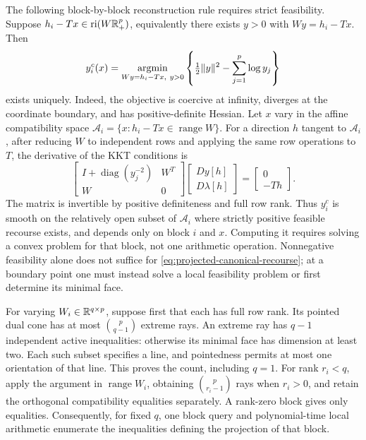 The following block-by-block reconstruction rule requires strict
feasibility.  Suppose $h_i-Tx\in\operatorname{ri}(W\mathbb R_+^p)$, equivalently there exists
$y>0$ with $Wy=h_i-Tx$.  Then
\begin{equation}\label{eq:projected-canonical-recourse}
 y_i^c(x)=\underset{Wy=h_i-Tx,\ y>0}{\operatorname{argmin}}
 \left\{\tfrac12\lVert y\rVert^2-\sum_{j=1}^p\log y_j\right\}
\end{equation}
exists uniquely.  Indeed, the objective is coercive at infinity, diverges
at the coordinate boundary, and has positive-definite Hessian.
Let $x$ vary in the affine compatibility space
$\mathcal A_i=\{x:h_i-Tx\in\operatorname{range}W\}$.
For a direction $h$ tangent to $\mathcal A_i$, after reducing $W$ to
independent rows and applying the same row operations to $T$, the
derivative of the KKT conditions is
\[
 \begin{bmatrix}I+\operatorname{diag}(y_j^{-2})&W^T\\W&0\end{bmatrix}
 \begin{bmatrix}Dy[h]\\D\lambda[h]\end{bmatrix}
 =\begin{bmatrix}0\\-Th\end{bmatrix}.
\]
The matrix is invertible by positive definiteness and full row rank.
Thus $y_i^c$ is smooth on the relatively open subset of $\mathcal A_i$
where strictly positive feasible recourse exists, and depends only on
block $i$ and $x$.  Computing it requires solving a convex problem for
that block, not one arithmetic operation.
Nonnegative feasibility alone does not suffice for
\eqref{eq:projected-canonical-recourse}; at a boundary point one must
instead solve a local feasibility problem or first determine its minimal
face.

For varying $W_i\in\mathbb R^{q\times p}$, suppose first that each has full row
rank.  Its pointed dual cone has at most $\binom p{q-1}$ extreme rays.
An extreme ray has $q-1$ independent active inequalities: otherwise its
minimal face has dimension at least two.  Each such subset specifies a line,
and pointedness permits at most one orientation of that line.  This proves
the count, including $q=1$.  For rank $r_i<q$, apply the argument in
$\operatorname{range}W_i$, obtaining $\binom p{r_i-1}$ rays when $r_i>0$,
and retain the orthogonal compatibility equalities separately.  A rank-zero
block gives only equalities.  Consequently, for fixed $q$, one block query
and polynomial-time local arithmetic enumerate the inequalities defining
the projection of that block.

